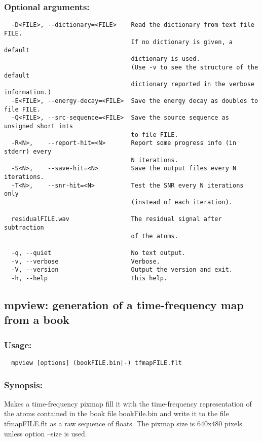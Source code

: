 \documentclass[11pt,a4paper]{article}
\begin{document}
\subsubsection*{Optional arguments:}
\begin{verbatim}
  -D<FILE>, --dictionary=<FILE>    Read the dictionary from text file FILE.
                                   If no dictionary is given, a default
                                   dictionary is used.
                                   (Use -v to see the structure of the default
                                   dictionary reported in the verbose information.)
  -E<FILE>, --energy-decay=<FILE>  Save the energy decay as doubles to file FILE.
  -Q<FILE>, --src-sequence=<FILE>  Save the source sequence as unsigned short ints
                                   to file FILE.
  -R<N>,    --report-hit=<N>       Report some progress info (in stderr) every
                                   N iterations.
  -S<N>,    --save-hit=<N>         Save the output files every N iterations.
  -T<N>,    --snr-hit=<N>          Test the SNR every N iterations only
                                   (instead of each iteration).

  residualFILE.wav                 The residual signal after subtraction
                                   of the atoms.

  -q, --quiet                      No text output.
  -v, --verbose                    Verbose.
  -V, --version                    Output the version and exit.
  -h, --help                       This help.
\end{verbatim}


\clearpage
\subsection{mpview: generation of a time-frequency map from
  a book}

\subsubsection*{Usage:}
\begin{verbatim}
  mpview [options] (bookFILE.bin|-) tfmapFILE.flt
\end{verbatim}

\subsubsection*{Synopsis:}
Makes a time-frequency pixmap fill it with the time-frequency representation of
the atoms contained in the book file bookFile.bin and write it to the file
tfmapFILE.flt as a raw sequence of floats. The pixmap size is 640x480 pixels
unless option --size is used.
\end{document}
